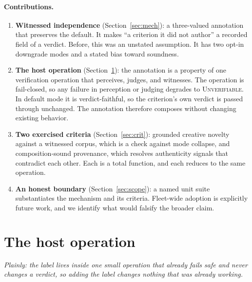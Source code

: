 \documentclass[11pt]{article}
\begin{document}
\paragraph{Contributions.}
\begin{enumerate}[leftmargin=*,itemsep=2pt]
\item \textbf{Witnessed independence} (Section~\ref{sec:mech}): a three-valued annotation that preserves the default. It makes ``a criterion it did not author'' a recorded field of a verdict. Before, this was an unstated assumption. It has two opt-in downgrade modes and a stated bias toward soundness.
\item \textbf{The host operation} (Section~\ref{sec:op}): the annotation is a property of one verification operation that perceives, judges, and witnesses. The operation is fail-closed, so any failure in perception or judging degrades to \textsc{Unverifiable}. In default mode it is verdict-faithful, so the criterion's own verdict is passed through unchanged. The annotation therefore composes without changing existing behavior.
\item \textbf{Two exercised criteria} (Section~\ref{sec:crit}): grounded creative novelty against a witnessed corpus, which is a check against mode collapse, and composition-sound provenance, which resolves authenticity signals that contradict each other. Each is a total function, and each reduces to the same operation.
\item \textbf{An honest boundary} (Section~\ref{sec:scope}): a named unit suite substantiates the mechanism and its criteria. Fleet-wide adoption is explicitly future work, and we identify what would falsify the broader claim.
\end{enumerate}

\section{The host operation}\label{sec:op}
\emph{Plainly: the label lives inside one small operation that already fails safe and never changes a verdict, so adding the label changes nothing that was already working.}
\end{document}
